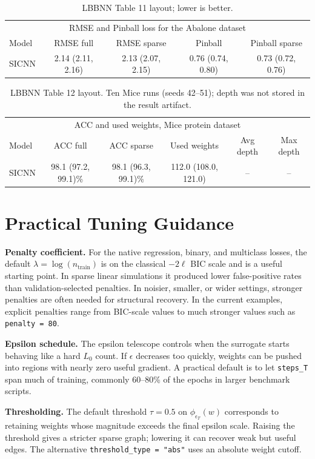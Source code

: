 \documentclass{article}
\begin{document}
\begin{table}[t]\centering\small\begin{tabular}{lcccc}\hline\multicolumn{5}{c}{RMSE and Pinball loss for the Abalone dataset}\\ Model & RMSE full & RMSE sparse & Pinball & Pinball sparse\\\hline SICNN & 2.14 (2.11, 2.16) & 2.13 (2.07, 2.15) & 0.76 (0.74, 0.80) & 0.73 (0.72, 0.76)\\\hline\end{tabular}\caption{LBBNN Table 11 layout; lower is better.}\end{table}
\begin{table}[t]\centering\small\begin{tabular}{lccccc}\hline\multicolumn{6}{c}{ACC and used weights, Mice protein dataset}\\ Model & ACC full & ACC sparse & Used weights & Avg depth & Max depth\\\hline SICNN & 98.1 (97.2, 99.1)\% & 98.1 (96.3, 99.1)\% & 112.0 (108.0, 121.0) & -- & --\\\hline\end{tabular}\caption{LBBNN Table 12 layout. Ten Mice runs (seeds 42--51); depth was not stored in the result artifact.}\end{table}

\section{Practical Tuning Guidance}
\textbf{Penalty coefficient.}
For the native regression, binary, and multiclass losses, the default \(\lambda=\log(n_{\mathrm{train}})\) is on the classical \(-2\ell\) BIC scale and is a useful starting point. In sparse linear simulations it produced lower false-positive rates than validation-selected penalties. In noisier, smaller, or wider settings, stronger penalties are often needed for structural recovery. In the current examples, explicit penalties range from BIC-scale values to much stronger values such as \texttt{penalty = 80}.

\textbf{Epsilon schedule.}
The epsilon telescope controls when the surrogate starts behaving like a hard $L_0$ count. If $\epsilon$ decreases too quickly, weights can be pushed into regions with nearly zero useful gradient. A practical default is to let \texttt{steps\_T} span much of training, commonly 60--80\% of the epochs in larger benchmark scripts.

\textbf{Thresholding.}
The default threshold \(\tau=0.5\) on \(\phi_{\epsilon_T}(w)\) corresponds to retaining weights whose magnitude exceeds the final epsilon scale. Raising the threshold gives a stricter sparse graph; lowering it can recover weak but useful edges. The alternative \texttt{threshold\_type = "abs"} uses an absolute weight cutoff.
\end{document}
